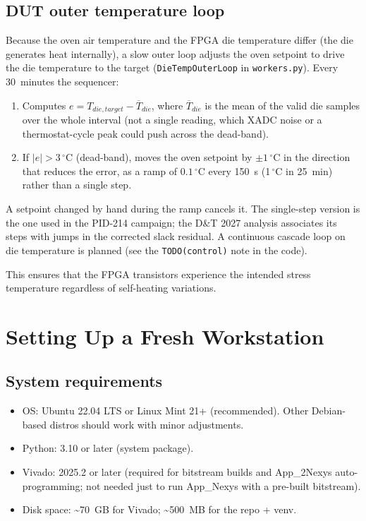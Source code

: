 \documentclass[12pt, a4paper]{report}
\begin{document}
\section{DUT outer temperature loop}

Because the oven air temperature and the FPGA die temperature differ (the die generates
heat internally), a slow outer loop adjusts the oven setpoint to drive the die temperature
to the target (\texttt{DieTempOuterLoop} in \texttt{workers.py}). Every 30~minutes the sequencer:

\begin{enumerate}
  \item Computes $e = T_{die,target} - \overline{T}_{die}$, where $\overline{T}_{die}$ is the
        mean of the valid die samples over the whole interval (not a single reading, which
        XADC noise or a thermostat-cycle peak could push across the dead-band).
  \item If $|e| > 3\,^\circ\text{C}$ (dead-band), moves the oven setpoint by $\pm 1\,^\circ\text{C}$
        in the direction that reduces the error, as a ramp of $0.1\,^\circ\text{C}$ every
        150~s (1\,$^\circ$C in 25~min) rather than a single step.
\end{enumerate}

A setpoint changed by hand during the ramp cancels it. The single-step version is the one
used in the PID-214 campaign; the D\&T 2027 analysis associates its steps with jumps in the
corrected slack residual. A continuous cascade loop on die temperature is planned (see the
\texttt{TODO(control)} note in the code).

This ensures that the FPGA transistors experience the intended stress temperature
regardless of self-heating variations.

\chapter{Setting Up a Fresh Workstation}
\label{ch:setup}

\section{System requirements}

\begin{itemize}
  \item OS: Ubuntu 22.04 LTS or Linux Mint 21+ (recommended). Other Debian-based
        distros should work with minor adjustments.
  \item Python: 3.10 or later (system package).
  \item Vivado: 2025.2 or later (required for bitstream builds and App\_2Nexys
        auto-programming; not needed just to run App\_Nexys with a pre-built bitstream).
  \item Disk space: \textasciitilde{}70~GB for Vivado; \textasciitilde{}500~MB for the repo + venv.
\end{itemize}
\end{document}
